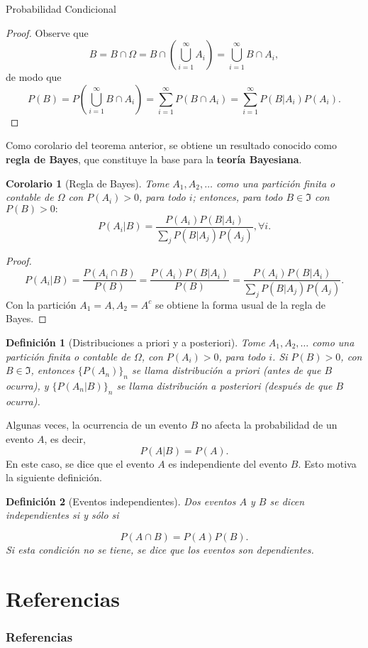 \documentclass{beamer}
\newtheorem{defi}{Definición}[section]
\newtheorem{corol}{Corolario}[section]
\begin{document}
\begin{frame}[allowframebreaks]{Probabilidad Condicional}
		\begin{proof}
			Observe que
			$$B=B\cap\Omega=B\cap\left( \bigcup_{i=1}^\infty A_i \right)=\bigcup_{i=1}^\infty B\cap A_i,$$
			de modo que
			$$P(B)=P\left(\bigcup_{i=1}^\infty B\cap A_i\right)=\sum_{i=1}^\infty P(B\cap A_i)=\sum_{i=1}^\infty P(B| A_i)P(A_i).$$
		\end{proof}
		Como corolario del teorema anterior, se obtiene un resultado conocido como \textbf{regla de Bayes}, que constituye la base para la \textbf{teoría Bayesiana}.
		\begin{corol}[Regla de Bayes]
			Tome $A_1,A_2,\dots$ como una partición finita o contable de $\Omega$ con $P(A_i)>0$, para todo $i$; entonces, para todo $B\in\Im$ con $P(B)>0:$
			$$P(A_i | B)=\frac{P(A_i)P(B| A_i)}{\sum_j P(B|A_j)P(A_j)}, \forall i.$$
		\end{corol}
		\begin{proof}
		$$P(A_i|B)=\frac{P(A_i\cap B)}{P(B)}=\frac{P(A_i)P(B|A_i)}{P(B)}=\frac{P(A_i)P(B| A_i)}{\sum_j P(B|A_j)P(A_j)}.$$
		Con la partición $A_1=A, A_2=A^c$ se obtiene la forma usual de la regla de Bayes.
	\end{proof}
	\begin{defi}[Distribuciones a priori y a posteriori]
		Tome $A_1,A_2,\dots$ como una partición finita o contable de $\Omega$, con $P(A_i)>0$, para todo $i$. Si $P(B)>0$, con $B\in\Im$, entonces $\{P(A_n)\}_n$ se llama distribución a priori (antes de que $B$ ocurra), y $\{P(A_n|B)\}_n$ se llama distribución a posteriori (después de que $B$ ocurra).
	\end{defi}
	Algunas veces, la ocurrencia de un evento $B$ no afecta la probabilidad de un evento $A$, es decir,
	$$P(A|B)=P(A).$$
	En este caso, se dice que el evento $A$ es independiente del evento $B$. Esto motiva la siguiente definición.
	\begin{defi}[Eventos independientes]
		Dos eventos $A$ y $B$ se dicen independientes si y sólo si
		
		$$P(A\cap B)=P(A)P(B).$$
		Si esta condición no se tiene, se dice que los eventos son dependientes.
	\end{defi}
	\end{frame}
	
	\section{Referencias}
	\begin{frame}
	\frametitle{Referencias}

	\nocite{*}
	
	

	\end{frame}
	
\end{document}
